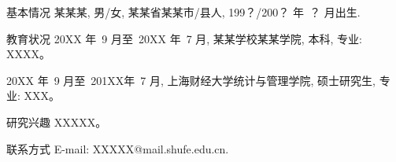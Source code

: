 \documentclass{sufethesismas}
\begin{document}
%
%
\begin{resume}

\begin{resumesection}{基本情况}
某某某, 男/女, 某某省某某市/县人, 199？/200？ 年~？ 月出生.
\end{resumesection}

\begin{resumelist}{教育状况}
20XX 年~9 月至~20XX 年~7 月, 某某学校某某学院, 本科, 专业: XXXX。

20XX 年~9 月至~201XX年~7 月, 上海财经大学统计与管理学院, 硕士研究生, 专业: XXX。
\end{resumelist}
%


\begin{resumesection}{研究兴趣}
XXXXX。
\end{resumesection}

\begin{resumesection}{联系方式}
E-mail: XXXXX@mail.shufe.edu.cn.
\end{resumesection}
%
\end{resume}
\end{document}
